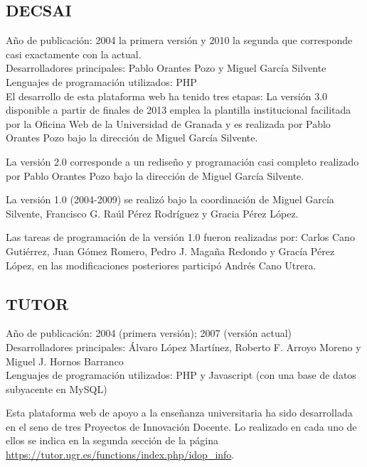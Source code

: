 \subsection{DECSAI}

Año de publicación: 2004 la primera versión y 2010 la segunda que corresponde casi exactamente con la actual.\\

Desarrolladores principales: Pablo Orantes Pozo y Miguel García Silvente\\

Lenguajes de programación utilizados: PHP\\

\bigskip
El desarrollo de esta plataforma web ha tenido tres etapas: 
La versión 3.0 disponible a partir de finales de 2013 emplea la plantilla institucional facilitada por la Oficina Web de la Universidad de Granada y es realizada por Pablo Orantes Pozo bajo la dirección de Miguel García Silvente.

\bigskip
La versión 2.0 corresponde a un rediseño y programación casi completo realizado por Pablo Orantes Pozo bajo la dirección de Miguel García Silvente.

\bigskip
La versión 1.0 (2004-2009) se realizó bajo la coordinación de Miguel García Silvente, Francisco G. Raúl Pérez Rodríguez y Gracia Pérez López.

\bigskip
Las tareas de programación de la versión 1.0 fueron realizadas por: Carlos Cano Gutiérrez, Juan Gómez Romero, Pedro J. Magaña Redondo y Gracía Pérez López, en las modificaciones posteriores participó Andrés Cano Utrera.

\subsection{TUTOR}

Año de publicación: 2004 (primera versión); 2007 (versión actual)\\

Desarrolladores principales: Álvaro López Martínez, Roberto F. Arroyo Moreno y Miguel J. Hornos Barranco\\

Lenguajes de programación utilizados: PHP y Javascript (con una base de datos subyacente en MySQL)

\bigskip
Esta plataforma web de apoyo a la enseñanza universitaria ha sido desarrollada en el seno de tres Proyectos de Innovación Docente. Lo realizado en cada uno de ellos se indica en la segunda sección de la página \url{https://tutor.ugr.es/functions/index.php/idop_info}.
